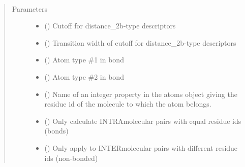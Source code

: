 \documentclass[letterpaper,10pt,english]{sphinxmanual}
\begin{document}
\begin{fulllineitems}
\label{\detokenize{descriptors:gap.descriptors.distance_2b}}~\begin{quote}\begin{description}
\item[{Parameters}] \leavevmode\begin{itemize}
\item {} 
 () \textendash{} Cutoff for distance\_2b-type descriptors

\item {} 
 () \textendash{} Transition width of cutoff for distance\_2b-type descriptors

\item {} 
 () \textendash{} Atom type \#1 in bond

\item {} 
 () \textendash{} Atom type \#2 in bond

\item {} 
 () \textendash{} Name of an integer property in the atoms object giving the residue id of the molecule to which the atom belongs.

\item {} 
 () \textendash{} Only calculate INTRAmolecular pairs with equal residue ids (bonds)

\item {} 
 () \textendash{} Only apply to INTERmolecular pairs with different residue ids (non-bonded)

\end{itemize}

\end{description}\end{quote}

\end{fulllineitems}
\end{document}
